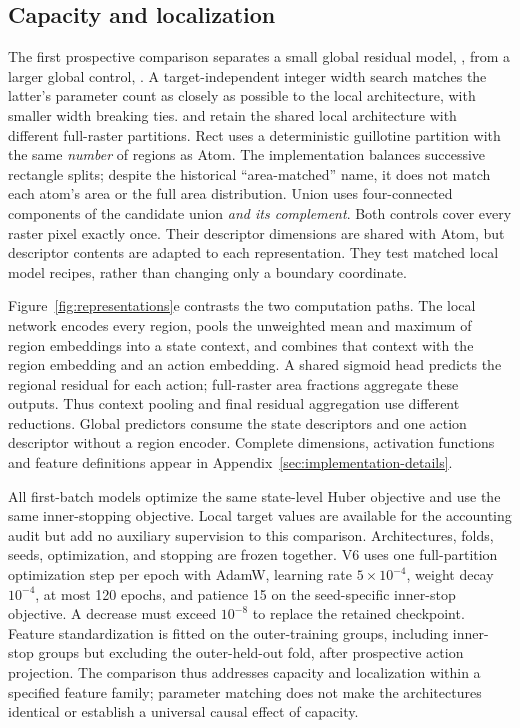 \subsection{Capacity and localization}
The first prospective comparison separates a small global residual model,
, from a larger global control,
. A target-independent integer width search matches the
latter's parameter count as closely as possible to the local
 architecture, with smaller width breaking ties.
 and  retain the shared local architecture
with different full-raster partitions. Rect uses a deterministic guillotine
partition with the same \emph{number} of regions as Atom. The implementation
balances successive rectangle splits; despite the historical ``area-matched''
name, it does not match each atom's area or the full area distribution.
Union uses four-connected components of the candidate union \emph{and its
complement}. Both controls cover every raster pixel exactly once. Their
descriptor dimensions are shared with Atom, but descriptor contents are
adapted to each representation. They test matched local model recipes,
rather than changing only a boundary coordinate.


Figure~\ref{fig:representations}e contrasts the two computation paths.
The local network encodes every region, pools the unweighted mean and maximum
of region embeddings into a state context, and combines that context with
the region embedding and an action embedding. A shared sigmoid head predicts
the regional residual for each action; full-raster area fractions aggregate
these outputs. Thus context pooling and final residual aggregation use
different reductions. Global predictors consume the state descriptors and
one action descriptor without a region encoder. Complete dimensions,
activation functions and feature definitions appear in
Appendix~\ref{sec:implementation-details}.

All first-batch models optimize the same state-level Huber objective and use
the same inner-stopping objective. Local target values are available for the
accounting audit but add no auxiliary supervision to this comparison.
Architectures, folds, seeds, optimization, and stopping are frozen together.
V6 uses one full-partition optimization step per epoch with AdamW, learning
rate $5\times10^{-4}$, weight decay $10^{-4}$, at most 120 epochs, and
patience 15 on the seed-specific inner-stop objective. A decrease must
exceed $10^{-8}$ to replace the retained checkpoint. Feature standardization
is fitted on the outer-training groups, including inner-stop groups but
excluding the outer-held-out fold, after prospective action projection.
The comparison thus addresses capacity and localization within a specified
feature family; parameter matching does not make the architectures identical
or establish a universal causal effect of capacity.

